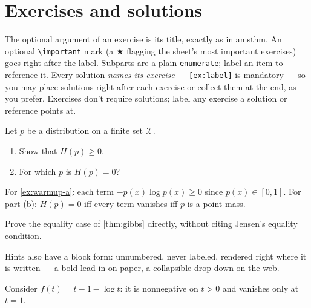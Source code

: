 \documentclass[11pt]{article}
\begin{document}
\section{Exercises and solutions}
\label{sec:exercises}

The optional argument of an exercise is its title, exactly as in amsthm.
An optional \verb|\important| mark (a $\bigstar$ flagging the sheet's most
important exercises) goes right after the label. Subparts are a plain
\texttt{enumerate}; label an item to reference it. Every solution
\emph{names its exercise} — \texttt{[ex:label]} is mandatory — so you may
place solutions right after each exercise or collect them at the end, as you
prefer. Exercises don't require solutions; label any exercise a solution or
reference points at.

\begin{exercise}
\label{ex:warmup}
Let $p$ be a distribution on a finite set $\mathcal{X}$.
\begin{enumerate}
  \item Show that $H(p) \geq 0$.
        \label{ex:warmup-a}
  \item For which $p$ is $H(p) = 0$?
\end{enumerate}
\end{exercise}

\begin{solution}[ex:warmup]
For \cref{ex:warmup-a}: each term $-p(x)\log p(x) \geq 0$ since
$p(x) \in [0,1]$. For part (b): $H(p) = 0$ iff every term vanishes iff $p$ is
a point mass. 
\end{solution}

\begin{exercise}
\label{ex:gibbs-hard}
\important
Prove the equality case of \cref{thm:gibbs} directly, without citing Jensen's
equality condition. 
\end{exercise}

Hints also have a block form: unnumbered, never labeled, rendered right where
it is written — a bold lead-in on paper, a collapsible drop-down on the web.

\begin{hint}
Consider $f(t) = t - 1 - \log t$: it is nonnegative on $t > 0$ and vanishes
only at $t = 1$.
\end{hint}
\end{document}
